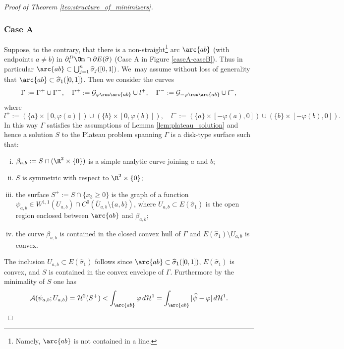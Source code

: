 \begin{proof}[Proof of Theorem \ref{teo:structure_of_minimizers}]
\subsubsection*{Case A}
Suppose, to the contrary,
that there is a non-straight\footnote{Namely, $\arc{ab}$ is not contained in a line.} arc $\arc{ab}$ (with endpoints $a\ne b$) in $\partial_i^D\Om\cap\partial E(\widehat\sigma)$ (Case A in Figure \ref{caseA-caseB}). Thus in particular $\arc{ab}\subset\bigcup_{j=1}^n\widehat\sigma_j([0,1])$. We~may assume without loss of generality that $\arc{ab}\subset\widehat\sigma_1([0,1])$.
Then we consider the curves
\begin{equation}\label{def:curve}
\Gamma:=\Gamma^+\cup\Gamma^-,\quad
\Gamma^+:=\mathcal{G}_{\varphi\res\arc{ab}}\cup l^+,\quad \Gamma^-:=\mathcal{G}_{-\varphi\res\arc{ab}}\cup l^-,
\end{equation}
where
\begin{equation*}
l^+:=(\{a\}\times[0,\varphi(a)])\cup (\{b\}\times[0,\varphi(b)]),\quad
l^-:=(\{a\}\times[-\varphi(a),0])\cup (\{b\}\times[-\varphi(b),0]).
\end{equation*}
In this way $\Gamma$ satisfies the assumptions of Lemma \ref{lem:plateau_solution} and hence a solution $S$ to the Plateau problem spanning $\Gamma$ is a disk-type surface such that:
\begin{enumerate}[(i),wide]
\item\label{i} $\beta_{a,b}:=S\cap (\R^2\times\{0\})$
is a simple analytic curve joining $a$ and $b$;
\item\label{ii}$S$ is symmetric with respect to $\R^2\times\{0\}$;
\item \label{iii} the surface $S^+:=S\cap\{x_3\ge0\}$
is the graph of a function $\psi_{a,b}\in W^{1,1}( U_{a,b})\cap C^0(\overline U_{a,b}\setminus\{a,b\})$, where $U_{a,b}\subset E(\widehat\sigma_1)$ is the open region enclosed between $\arc{ab}$ and $\beta_{a,b}$;
\item\label{iv} the curve $\beta_{a,b}$ is contained in the closed
convex hull of $\Gamma$ and $E(\widehat\sigma_1)\setminus U_{a,b}$ is convex.
\end{enumerate}
The inclusion $U_{a,b}\subset E(\widehat\sigma_1)$ follows since $\arc{ab}\subset\widehat\sigma_1([0,1])$, $E(\widehat\sigma_1)$ is convex, and $S$ is contained in the convex envelope of $\Gamma$.
Furthermore by the minimality of $S$ one has
\begin{equation}\label{eq:contradiction}
\mathcal{A}(\psi_{a,b};U_{a,b})=\mathcal{H}^2(S^+)< \int_{\arc{ab}}\varphi\,d\mathcal{H}^1= \int_{\arc{ab}}|\widehat\psi-\varphi|\,d\mathcal{H}^1.

\end{equation}
\end{proof}
